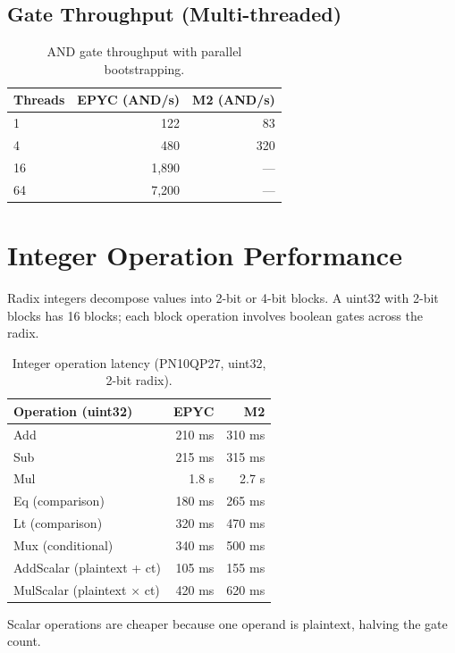 \documentclass[11pt]{article}
\begin{document}
\subsection{Gate Throughput (Multi-threaded)}

\begin{table}[h]
\centering
\begin{tabular}{@{}lrr@{}}
\toprule
\textbf{Threads} & \textbf{EPYC (AND/s)} & \textbf{M2 (AND/s)} \\
\midrule
1 & 122 & 83 \\
4 & 480 & 320 \\
16 & 1,890 & --- \\
64 & 7,200 & --- \\
\bottomrule
\end{tabular}
\caption{AND gate throughput with parallel bootstrapping.}
\label{tab:gate-throughput}
\end{table}

\section{Integer Operation Performance}

Radix integers decompose values into 2-bit or 4-bit blocks. A uint32 with 2-bit blocks has 16 blocks; each block operation involves boolean gates across the radix.

\begin{table}[h]
\centering
\begin{tabular}{@{}lrr@{}}
\toprule
\textbf{Operation (uint32)} & \textbf{EPYC} & \textbf{M2} \\
\midrule
Add & 210 ms & 310 ms \\
Sub & 215 ms & 315 ms \\
Mul & 1.8 s & 2.7 s \\
Eq (comparison) & 180 ms & 265 ms \\
Lt (comparison) & 320 ms & 470 ms \\
Mux (conditional) & 340 ms & 500 ms \\
\midrule
AddScalar (plaintext + ct) & 105 ms & 155 ms \\
MulScalar (plaintext $\times$ ct) & 420 ms & 620 ms \\
\bottomrule
\end{tabular}
\caption{Integer operation latency (PN10QP27, uint32, 2-bit radix).}
\label{tab:int-ops}
\end{table}

Scalar operations are cheaper because one operand is plaintext, halving the gate count.
\end{document}
